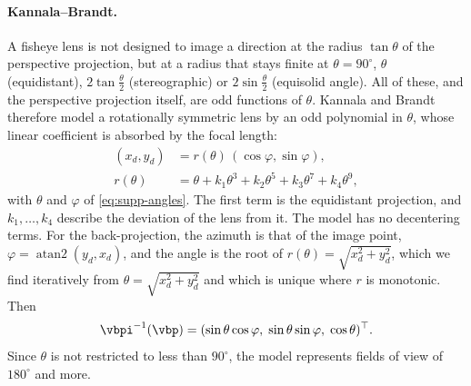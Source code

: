 \paragraph{Kannala--Brandt.} A fisheye lens is not designed to image
a direction at the radius $\tan\theta$ of the perspective projection,
but at a radius that stays finite at $\theta=90^\circ$, \eg $\theta$
(equidistant), $2\tan\frac{\theta}{2}$ (stereographic) or
$2\sin\frac{\theta}{2}$ (equisolid angle). All of these, and the
perspective projection itself, are odd functions of $\theta$.
Kannala and Brandt \cite{kannala-brandt} therefore model a
rotationally symmetric lens by an odd polynomial in $\theta$, whose
linear coefficient is absorbed by the focal length:
\begin{align}
\label{eq:supp-kannala-brandt}
    (x_d,y_d) &= r(\theta)\,(\cos\varphi,\sin\varphi),\nonumber\\
    r(\theta) &= \theta+k_1\theta^3+k_2\theta^5+k_3\theta^7+k_4\theta^9,
\end{align}
with $\theta$ and $\varphi$ of \cref{eq:supp-angles}. The first term
is the equidistant projection, and $k_1,\dots,k_4$ describe the
deviation of the lens from it. The model has no decentering terms.
For the back-projection, the azimuth is that of the image point,
$\varphi=\operatorname{atan2}(y_d,x_d)$, and the angle is the root of
$r(\theta)=\sqrt{x_d^2+y_d^2}$, which we find iteratively
from $\theta=\sqrt{x_d^2+y_d^2}$ and which is unique where $r$ is
monotonic. Then
\begin{equation}
    \vbpi^{-1}(\vbp)=(\sin\theta\cos\varphi,\;\sin\theta\sin\varphi,\;\cos\theta)^\top .
\end{equation}
Since $\theta$ is not restricted to less than $90^\circ$, the model
represents fields of view of $180^\circ$ and more.

